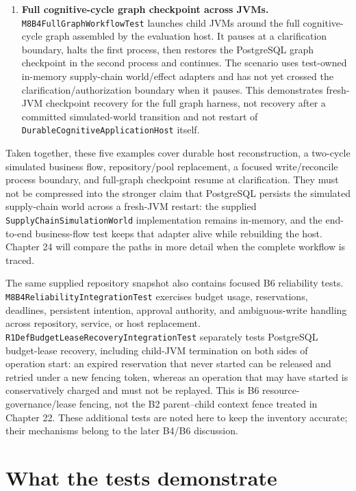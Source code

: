 \begin{enumerate}
  \item \textbf{Full cognitive-cycle graph checkpoint across JVMs.} \texttt{M8B4FullGraph}\allowbreak\texttt{WorkflowTest} launches child JVMs around the full cognitive-cycle graph assembled by the evaluation host. It pauses at a clarification boundary, halts the first process, then restores the PostgreSQL graph checkpoint in the second process and continues. The scenario uses test-owned in-memory supply-chain world/effect adapters and has not yet crossed the clarification/authorization boundary when it pauses. This demonstrates fresh-JVM checkpoint recovery for the full graph harness, not recovery after a committed simulated-world transition and not restart of \texttt{DurableCognitive\allowbreak{}ApplicationHost} itself.
\end{enumerate}

Taken together, these five examples cover durable host reconstruction, a two-cycle simulated business flow, repository/pool replacement, a focused write/reconcile process boundary, and full-graph checkpoint resume at clarification. They must not be compressed into the stronger claim that PostgreSQL persists the simulated supply-chain world across a fresh-JVM restart: the supplied \texttt{SupplyChain\allowbreak{}SimulationWorld} implementation remains in-memory, and the end-to-end business-flow test keeps that adapter alive while rebuilding the host. Chapter 24 will compare the paths in more detail when the complete workflow is traced.

The same supplied repository snapshot also contains focused B6 reliability tests. \texttt{M8B4Reliability\allowbreak{}IntegrationTest} exercises budget usage, reservations, deadlines, persistent intention, approval authority, and ambiguous-write handling across repository, service, or host replacement. \texttt{R1DefBudgetLease\allowbreak{}RecoveryIntegrationTest} separately tests PostgreSQL budget-lease recovery, including child-JVM termination on both sides of operation start: an expired reservation that never started can be released and retried under a new fencing token, whereas an operation that may have started is conservatively charged and must not be replayed. This is B6 resource-governance/lease fencing, not the B2 parent--child context fence treated in Chapter 22. These additional tests are noted here to keep the inventory accurate; their mechanisms belong to the later B4/B6 discussion.

\section{What the tests demonstrate}
\label{sec:ch19-test-evidence}

